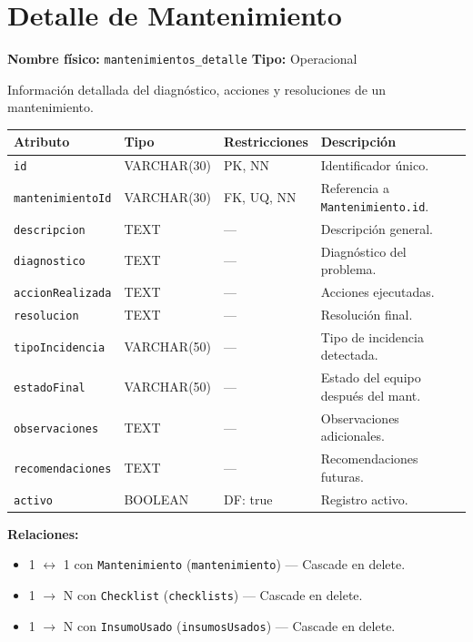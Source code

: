 \documentclass[12pt,a4paper]{article}
\newenvironment{tabladesc}[3]{%
  \section{#1}
  \textbf{Nombre físico:} \texttt{#2} \hfill \textbf{Tipo:} #3\par
  \medskip
}{%
  \bigskip
}
\begin{document}
\begin{tabladesc}{Detalle de Mantenimiento}{mantenimientos\_detalle}{Operacional}

Información detallada del diagnóstico, acciones y resoluciones de un mantenimiento.

\bigskip
\begin{longtable}{L{3.5cm} L{2.5cm} L{2cm} L{7.5cm}}
\toprule
\textbf{Atributo} & \textbf{Tipo} & \textbf{Restricciones} & \textbf{Descripción} \\
\midrule
\endhead
\bottomrule
\endfoot
\texttt{id}             & VARCHAR(30) & PK, NN & Identificador único. \\
\texttt{mantenimientoId}& VARCHAR(30) & FK, UQ, NN & Referencia a \texttt{Mantenimiento.id}. \\
\texttt{descripcion}    & TEXT        & ---    & Descripción general. \\
\texttt{diagnostico}    & TEXT        & ---    & Diagnóstico del problema. \\
\texttt{accionRealizada}& TEXT        & ---    & Acciones ejecutadas. \\
\texttt{resolucion}     & TEXT        & ---    & Resolución final. \\
\texttt{tipoIncidencia} & VARCHAR(50) & ---    & Tipo de incidencia detectada. \\
\texttt{estadoFinal}    & VARCHAR(50) & ---    & Estado del equipo después del mant. \\
\texttt{observaciones}  & TEXT        & ---    & Observaciones adicionales. \\
\texttt{recomendaciones}& TEXT        & ---    & Recomendaciones futuras. \\
\texttt{activo}         & BOOLEAN     & DF: true & Registro activo. \\
\bottomrule
\end{longtable}

\textbf{Relaciones:}
\begin{itemize}[nosep]
  \item 1 $\leftrightarrow$ 1 con \texttt{Mantenimiento} (\texttt{mantenimiento}) — Cascade en delete.
  \item 1 $\rightarrow$ N con \texttt{Checklist} (\texttt{checklists}) — Cascade en delete.
  \item 1 $\rightarrow$ N con \texttt{InsumoUsado} (\texttt{insumosUsados}) — Cascade en delete.
\end{itemize}
\end{tabladesc}
\end{document}
